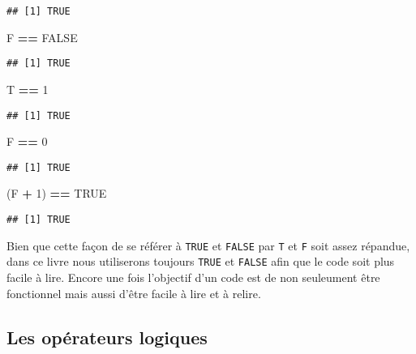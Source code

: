 \documentclass[]{book}
\newenvironment{Shaded}{\begin{snugshade}}{\end{snugshade}}
\newcommand{\DecValTok}[1]{\textcolor[rgb]{0.00,0.00,0.81}{#1}}
\newcommand{\StringTok}[1]{\textcolor[rgb]{0.31,0.60,0.02}{#1}}
\newcommand{\OtherTok}[1]{\textcolor[rgb]{0.56,0.35,0.01}{#1}}
\newcommand{\OperatorTok}[1]{\textcolor[rgb]{0.81,0.36,0.00}{\textbf{#1}}}
\newcommand{\NormalTok}[1]{#1}
\theoremstyle{definition}
\theoremstyle{definition}
\theoremstyle{definition}
\theoremstyle{remark}
\begin{document}
\begin{verbatim}
## [1] TRUE
\end{verbatim}

\begin{Shaded}
\begin{Highlighting}[]
\NormalTok{F }\OperatorTok{==}\StringTok{ }\OtherTok{FALSE}
\end{Highlighting}
\end{Shaded}

\begin{verbatim}
## [1] TRUE
\end{verbatim}

\begin{Shaded}
\begin{Highlighting}[]
\NormalTok{T }\OperatorTok{==}\StringTok{ }\DecValTok{1}
\end{Highlighting}
\end{Shaded}

\begin{verbatim}
## [1] TRUE
\end{verbatim}

\begin{Shaded}
\begin{Highlighting}[]
\NormalTok{F }\OperatorTok{==}\StringTok{ }\DecValTok{0}
\end{Highlighting}
\end{Shaded}

\begin{verbatim}
## [1] TRUE
\end{verbatim}

\begin{Shaded}
\begin{Highlighting}[]
\NormalTok{(F }\OperatorTok{+}\StringTok{ }\DecValTok{1}\NormalTok{) }\OperatorTok{==}\StringTok{ }\OtherTok{TRUE}
\end{Highlighting}
\end{Shaded}

\begin{verbatim}
## [1] TRUE
\end{verbatim}

Bien que cette façon de se référer à \texttt{TRUE} et \texttt{FALSE} par
\texttt{T} et \texttt{F} soit assez répandue, dans ce livre nous
utiliserons toujours \texttt{TRUE} et \texttt{FALSE} afin que le code
soit plus facile à lire. Encore une fois l'objectif d'un code est de non
seuleument être fonctionnel mais aussi d'être facile à lire et à relire.

\subsection{Les opérateurs logiques}\label{l011oplog}
\end{document}
